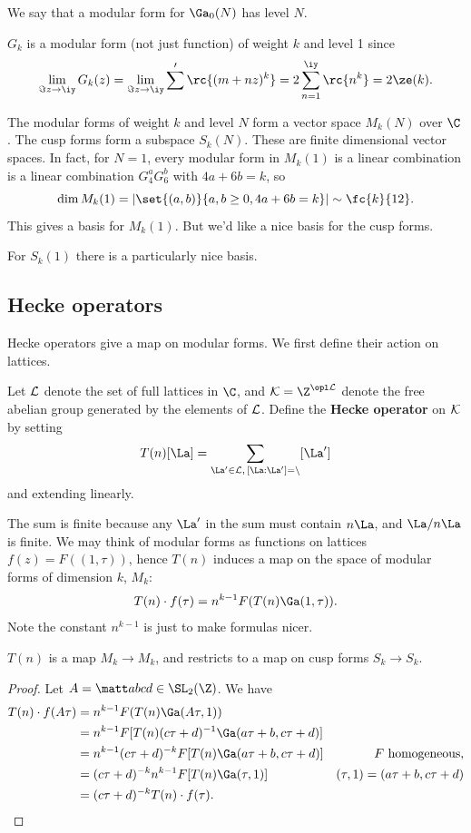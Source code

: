 We say that a modular form for $\Ga_0(N)$ has level $N$.
\begin{ex}
$G_k$ is a modular form (not just function) of weight $k$ and level 1 since
\[
\lim_{\Im z\to \iy} G_k(z)=\lim_{\Im z\to \iy} \sum'\rc{(m+nz)^k}=2\sum_{n=1}^{\iy} \rc{n^k}=2\ze(k).
\]
\end{ex}
The modular forms of weight $k$ and level $N$ form a vector space $M_k(N)$ over $\C$. The cusp forms form a subspace $S_k(N)$. These are finite dimensional vector spaces. In fact, for $N=1$, every modular form in $M_k(1)$ is a linear combination is a linear combination  $G_4^aG_6^b$ with $4a+6b=k$, so
\[
\dim M_k(1)=|\set{(a,b)}{a,b\ge 0,4a+6b=k}|\sim \fc{k}{12}.
\]
This gives a basis for $M_k(1)$. But we'd like a nice basis for the cusp forms.

For $S_k(1)$ there is a particularly nice basis.
\subsection{Hecke operators}
Hecke operators give a map on modular forms. We first define their action on lattices.
\begin{df}
Let $\cal L$ denote the set of full lattices in $\C$, and $\cal K=\Z^{\opl \cal L}$ denote the free abelian group generated by the elements of $\cal L$. Define the \textbf{Hecke operator} on $\cal K$ by setting
\[
T(n)[\La]=\sum_{\La'\in \cal L,\,[\La:\La']=n}[\La']
\]
and extending linearly.
\end{df}
The sum is finite because any $\La'$ in the sum must contain $n\La$, and $\La/n\La$ is finite. We may think of modular forms as functions on lattices $f(z)=F((1,\tau))$, hence $T(n)$ induces a map on the space of modular forms of dimension $k$, $M_k$:
\[
T(n)\cdot f(\tau)=n^{k-1}F(T(n)\Ga(1,\tau)).
\]
Note the constant $n^{k-1}$ is just to make formulas nicer.

\begin{pr}
$T(n)$ is a map $M_k\to M_k$, and restricts to a map on cusp forms $S_k\to S_k$.
\end{pr}
\begin{proof}
Let $A=\matt abcd\in \SL_2(\Z)$. We have
\begin{align*}
T(n)\cdot f(A\tau)&=n^{k-1}F(T(n)\Ga(A\tau,1))\\
&=n^{k-1}F[T(n)(c\tau+d)^{-1}\Ga(a\tau+b,c\tau+d)]\\
&=n^{k-1}(c\tau+d)^{-k}F[T(n)\Ga(a\tau+b,c\tau+d)]&F\text{ homogeneous},\\
&=(c\tau+d)^{-k}n^{k-1}F[T(n) \Ga(\tau,1)]&(\tau, 1)=(a\tau+b,c\tau+d)\\
&=(c\tau+d)^{-k} T(n)\cdot f(\tau).
\end{align*}
\end{proof}

